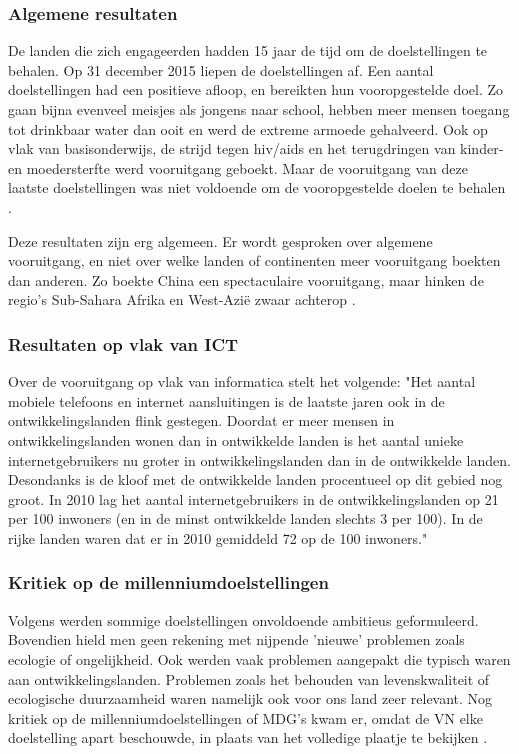 \subsubsection{Algemene resultaten}
De landen die zich engageerden hadden 15 jaar de tijd om de doelstellingen te behalen. Op 31 december 2015 liepen de doelstellingen af.
Een aantal doelstellingen had een positieve afloop, en bereikten hun vooropgestelde doel. Zo gaan bijna evenveel meisjes als jongens naar school, hebben meer mensen toegang tot drinkbaar water dan ooit en werd de extreme armoede gehalveerd. Ook op vlak van basisonderwijs, de strijd tegen hiv/aids en het terugdringen van kinder- en moedersterfte werd vooruitgang geboekt. Maar de vooruitgang van deze laatste doelstellingen was niet voldoende om de vooropgestelde doelen te behalen \autocite{Tierens2014}.

Deze resultaten zijn erg algemeen. Er wordt gesproken over algemene vooruitgang, en niet over welke landen of continenten meer vooruitgang boekten dan anderen. Zo boekte China een spectaculaire vooruitgang, maar hinken de regio's Sub-Sahara Afrika en West-Azië zwaar achterop \autocite{Tierens2014}.
 
 \subsubsection{Resultaten op vlak van ICT}
Over de vooruitgang op vlak van informatica stelt \autocite{Kampherbeek2012} het volgende: "Het aantal mobiele telefoons en internet aansluitingen is de laatste jaren ook in de ontwikkelingslanden flink gestegen. Doordat er meer mensen in ontwikkelingslanden wonen dan in ontwikkelde landen is het aantal unieke internetgebruikers nu groter in ontwikkelingslanden dan in de ontwikkelde landen. Desondanks is de kloof met de ontwikkelde landen procentueel op dit gebied nog groot. In 2010 lag het aantal internetgebruikers in de ontwikkelingslanden op 21 per 100 inwoners (en in de minst ontwikkelde landen slechts 3 per 100). In de rijke landen waren dat er in 2010 gemiddeld 72 op de 100 inwoners."
 
 \subsubsection{Kritiek op de millenniumdoelstellingen}
 Volgens \autocite{VN2015} werden sommige doelstellingen onvoldoende ambitieus geformuleerd. Bovendien hield men geen rekening met nijpende 'nieuwe' problemen zoals ecologie of ongelijkheid. Ook werden vaak problemen aangepakt die typisch waren aan ontwikkelingslanden. Problemen zoals het behouden van levenskwaliteit of ecologische duurzaamheid waren namelijk ook voor ons land zeer relevant. Nog kritiek op de millenniumdoelstellingen of MDG's kwam er, omdat de VN elke doelstelling apart beschouwde, in plaats van het volledige plaatje te bekijken \autocite{VN2015}.

